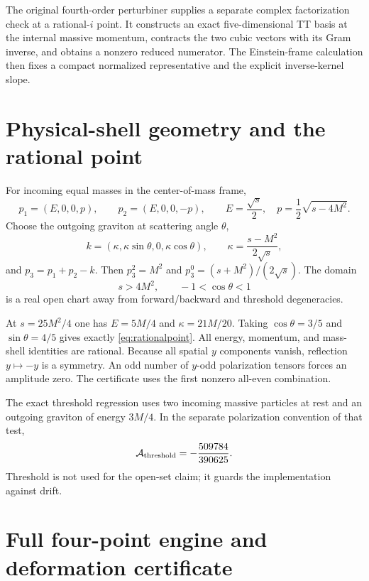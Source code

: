 \documentclass[11pt]{article}
\theoremstyle{definition}
\theoremstyle{remark}
\begin{document}
The original fourth-order perturbiner supplies a separate complex
factorization check at a rational-$i$ point.  It constructs an exact
five-dimensional TT basis at the internal massive momentum, contracts
the two cubic vectors with its Gram inverse, and obtains a nonzero
reduced numerator.  The Einstein-frame calculation then fixes a compact
normalized representative and the explicit inverse-kernel slope.

\section{Physical-shell geometry and the rational point}
\label{app:shell}

For incoming equal masses in the center-of-mass frame,
\begin{equation}
p_1=(E,0,0,p),\qquad p_2=(E,0,0,-p),
\qquad E=\frac{\sqrt s}{2},\quad
p=\frac12\sqrt{s-4M^2}.
\end{equation}
Choose the outgoing graviton at scattering angle $\theta$,
\begin{equation}
k=(\kappa,\kappa\sin\theta,0,\kappa\cos\theta),
\qquad
\kappa=\frac{s-M^2}{2\sqrt s},
\end{equation}
and $p_3=p_1+p_2-k$.  Then $p_3^2=M^2$ and
$p_3^0=(s+M^2)/(2\sqrt s)$.  The domain
\begin{equation}
s>4M^2,\qquad -1<\cos\theta<1
\end{equation}
is a real open chart away from forward/backward and threshold
degeneracies.

At $s=25M^2/4$ one has $E=5M/4$ and
$\kappa=21M/20$.  Taking $\cos\theta=3/5$ and
$\sin\theta=4/5$ gives exactly \eqref{eq:rationalpoint}.  All energy,
momentum, and mass-shell identities are rational.  Because all spatial
$y$ components vanish, reflection $y\mapsto-y$ is a symmetry.  An odd
number of $y$-odd polarization tensors forces an amplitude zero.  The
certificate uses the first nonzero all-even combination.

The exact threshold regression uses two incoming massive particles at
rest and an outgoing graviton of energy $3M/4$.  In the separate
polarization convention of that test,
\begin{equation}
\mathcal A_{\rm threshold}=-\frac{509784}{390625}.
\end{equation}
Threshold is not used for the open-set claim; it guards the implementation
against drift.

\section{Full four-point engine and deformation certificate}
\label{app:fourpoint}
\end{document}
